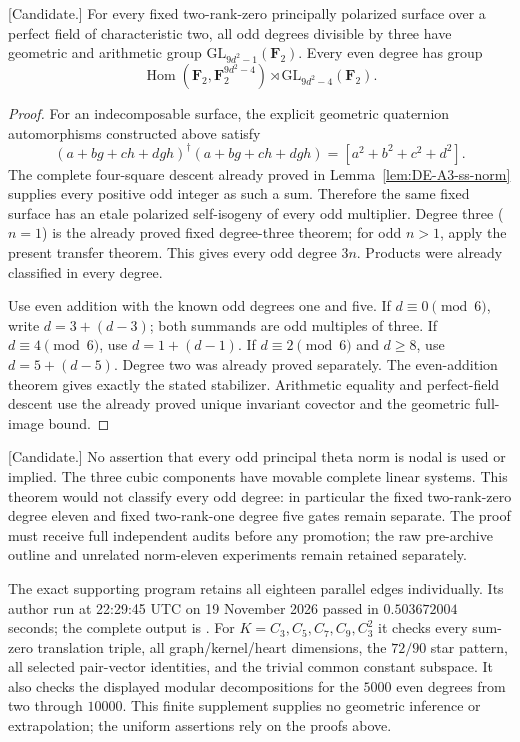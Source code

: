\begin{corollary}
\label{cor:f0-all-even-nine-theta-transfer-candidate}
\textup{[Candidate.]}
For every fixed two-rank-zero principally polarized surface over
a perfect field of characteristic two, all odd degrees divisible
by three have geometric and arithmetic group
$\mathrm{GL}_{9d^2-1}(\mathbf F_2)$. Every even degree has group
\[
 \operatorname{Hom}(\mathbf F_2,\mathbf F_2^{9d^2-4})\rtimes
            \mathrm{GL}_{9d^2-4}(\mathbf F_2).
\]
\end{corollary}

\begin{proof}
For an indecomposable surface, the explicit geometric quaternion
automorphisms constructed above satisfy
\[
 (a+bg+ch+dgh)^\dagger(a+bg+ch+dgh)
                         =[a^2+b^2+c^2+d^2].
\]
The complete four-square descent already proved in
Lemma~\ref{lem:DE-A3-ss-norm} supplies every positive odd integer
as such a sum. Therefore the same fixed surface has an etale
polarized self-isogeny of every odd multiplier. Degree three
($n=1$) is the already proved fixed degree-three theorem; for
odd $n>1$, apply the present transfer theorem. This gives every
odd degree $3n$. Products were already classified in every degree.

Use even addition with the known odd degrees one and five.
If $d\equiv0\pmod6$, write $d=3+(d-3)$; both summands are odd
multiples of three. If $d\equiv4\pmod6$, use $d=1+(d-1)$.
If $d\equiv2\pmod6$ and $d\ge8$, use $d=5+(d-5)$.
Degree two was already proved separately. The even-addition
theorem gives exactly the stated stabilizer. Arithmetic equality
and perfect-field descent use the already proved unique invariant
covector and the geometric full-image bound.
\end{proof}

\begin{remark}[Scope]
\label{rem:nine-theta-transfer-scope-candidate}
\textup{[Candidate.]}
No assertion that every odd principal theta norm is nodal is used
or implied. The three cubic components have movable complete
linear systems. This theorem would not classify every odd degree:
in particular the fixed two-rank-zero degree eleven and fixed
two-rank-one degree five gates remain separate. The proof must
receive full independent audits before any promotion; the raw
pre-archive outline and unrelated norm-eleven experiments remain
retained separately.

The exact supporting program
retains all eighteen parallel edges individually. Its author run
at 22:29:45 UTC on 19 November 2026 passed in $0.503672004$ seconds;
the complete output is
.
For $K=C_3,C_5,C_7,C_9,C_3^2$ it checks every sum-zero translation
triple, all graph/kernel/heart dimensions, the $72/90$ star pattern,
all selected pair-vector identities, and the trivial common
constant subspace. It also checks the displayed modular
decompositions for the $5000$ even degrees from two through
$10000$. This finite supplement supplies no geometric inference
or extrapolation; the uniform assertions rely on the proofs above.
\end{remark}
